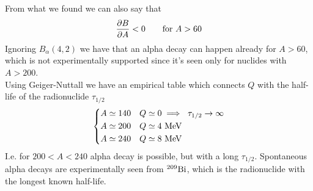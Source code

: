 \documentclass[../qm.tex]{subfiles}
\begin{document}
From what we found we can also say that
\begin{equation*}
	\pdv{B}{A}<0\qquad\text{for }A>60
\end{equation*}
Ignoring $B_\alpha(4,2)$ we have that an alpha decay can happen already for $A>60$, which is not experimentally supported since it's seen only for nuclides with $A>200$.\\
Using Geiger-Nuttall we have an empirical table which connects $Q$ with the half-life of the radionuclide $\tau_{1/2}$
\begin{equation*}
	\begin{dcases}
		A\simeq140&Q\simeq0\implies\ \tau_{1/2}\to\infty\\
		A\simeq200&Q\simeq4\ \mathrm{MeV}\\
		A\simeq240&Q\simeq8\ \mathrm{MeV}
	\end{dcases}
\end{equation*}
I.e. for $200<A<240$ alpha decay is possible, but with a long $\tau_{1/2}$. Spontaneous alpha decays are experimentally seen from $\nuc{Bi}{209}{}$, which is the radionuclide with the longest known half-life.
\end{document}
